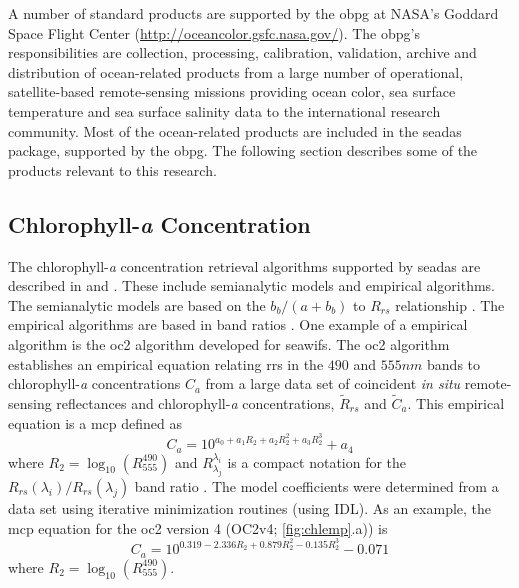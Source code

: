A number of standard products are supported by the \gls{obpg} at NASA's Goddard Space Flight Center (\url{http://oceancolor.gsfc.nasa.gov/}). The \gls{obpg}'s responsibilities are collection, processing, calibration, validation, archive and distribution of ocean-related products from a large number of operational, satellite-based remote-sensing missions providing ocean color, sea surface temperature and sea surface salinity data to the international research community. Most of the ocean-related products are included in the \gls{seadas} package, supported by the \gls{obpg}. The following section describes some of the products relevant to this research.

\subsection{Chlorophyll-{\it a} Concentration}

The chlorophyll-{\it a} concentration retrieval algorithms supported by \gls{seadas} are described in \cite{OReilly1998_Chl} and \cite{OReilly2000}. These include semianalytic models and empirical algorithms. The semianalytic models are based on the $b_b/(a + b_b)$ to $R_{rs}$ relationship \cite{Gordon:1988qv}. The empirical algorithms are based in band ratios \cite{OReilly2000}. One example of a empirical algorithm is the \gls{oc2} algorithm developed for \gls{seawifs}. The \gls{oc2} algorithm establishes an empirical equation relating \gls{rrs} in the $490$ and $555nm$ bands to chlorophyll-{\it a} concentrations $C_a$ from a large data set of coincident {\it in situ} remote-sensing reflectances and chlorophyll-{\it a} concentrations, $\tilde{R}_{rs}$ and $\tilde{C}_a$. This empirical equation is a \gls{mcp} defined as
\begin{equation}\label{eq:oc2}
  C_a = 10^{\displaystyle a_0+a_1R_2+a_2R_2^2+a_3R_2^3} + a_4
\end{equation}
\noindent where $R_2=\log_{10}\left(R_{555}^{490}\right)$ and $R_{\lambda_j}^{\lambda_i}$ is a compact notation for the $R_{rs}(\lambda_i)/R_{rs}(\lambda_j)$ band ratio \cite{OReilly2000}. The model coefficients were determined from a data set using iterative minimization routines (using IDL). As an example, the \gls{mcp} equation for the \gls{oc2} version 4 (OC2v4; \autoref{fig:chlemp}.a)) is
\begin{equation}
  C_a = 10^{\displaystyle 0.319-2.336R_2+0.879R_2^2-0.135R_2^3} - 0.071
\end{equation}
\noindent where $R_2=\log_{10}\left(R_{555}^{490}\right)$.

